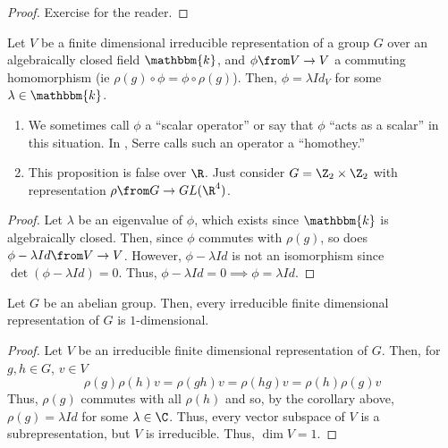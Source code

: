 \documentclass[11pt,leqno,oneside]{amsbook}
\newcommand{\bbk}{\mathbbm{k}}
\numberwithin{thm}{section}
\begin{document}
\begin{proof}
  Exercise for the reader.
\end{proof}
\begin{cor}\label{schur-alg-closed}
  Let \(V\) be a finite dimensional irreducible representation of a
  group \(G\) over an algebraically closed field \(\bbk\), and \(\phi
  \from V \to V\) a commuting homomorphism (ie \(\rho(g) \circ \phi = \phi
  \circ \rho(g)\)). Then, \(\phi = \lambda Id_V\) for some \(\lambda
  \in \bbk\).
\end{cor}
\begin{rmk}
  \begin{enumerate}
  \item We sometimes call \(\phi\) a ``scalar operator'' or say that
    \(\phi\) ``acts as a scalar'' in this situation. In \cite{serre},
    Serre calls such an operator a ``homothey.''
  \item This proposition is false over \(\R\). Just consider \(G = \Z_2
    \times \Z_2\) with representation \(\rho \from G \to
    GL(\R^4)\). 
  \end{enumerate}
\end{rmk}
\begin{proof}
  Let \(\lambda\) be an eigenvalue of \(\phi\), which exists since
  \(\bbk\) is algebraically closed. Then, since \(\phi\) commutes with
  \(\rho(g)\), so does \(\phi - \lambda Id \from V \to V\). However, \(\phi -
  \lambda Id\) is not an isomorphism since \(\det(\phi - \lambda Id) =
  0\). Thus, \(\phi - \lambda Id = 0 \implies \phi = \lambda Id\).
\end{proof}
\begin{cor}
  Let \(G\) be an abelian group. Then, every irreducible finite
  dimensional representation of \(G\) is \(1\)-dimensional.
\end{cor}
\begin{proof}
  Let \(V\) be an irreducible finite dimensional representation of
  \(G\). Then, for \(g,h \in G\), \(v \in V\) \[
    \rho(g) \rho(h) v = \rho(gh)v = \rho(hg)v = \rho(h)\rho(g) v
  \]
  Thus, \(\rho(g)\) commutes with all \(\rho(h)\) and so, by the
  corollary above, \(\rho(g) = \lambda Id\) for some \(\lambda \in
  \C\). Thus, every vector subspace of \(V\) is a subrepresentation,
  but \(V\) is irreducible. Thus, \(\dim V = 1\).
\end{proof}
\end{document}
